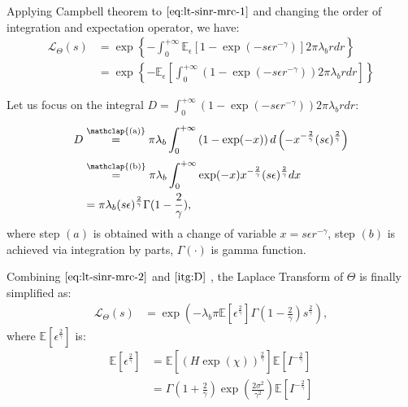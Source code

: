 Applying Campbell theorem to $\eqref{eq:lt-sinr-mrc-1}$ and changing the order of integration and expectation operator, we have:
\begin{align}
\label{eq:lt-sinr-mrc-2}
\mathcal{L}_{\Theta}\left( s \right) &= \exp \left\lbrace -\int_{0}^{+\infty}    \mathbb{E}_{\epsilon}\left[ 1-\exp(-s\epsilon r^{-\gamma} ) \right]   2 \pi \lambda_{b} r dr \right\rbrace \nonumber\\
&= \exp \left\lbrace -\mathbb{E}_{\epsilon}\left[ \int_{0}^{+\infty} \left(1-\exp(-s\epsilon r^{-\gamma} ) \right) 2 \pi \lambda_{b} r dr  \right]   \right\rbrace 
\end{align}

Let us focus on the integral $D = \int_{0}^{+\infty} \left(1-\exp(-s\epsilon r^{-\gamma} ) \right) 2 \pi \lambda_{b} r dr $:
\begin{align}
\label{itg:D}
D
&\overset{\mathclap{\strut\text{(a)}}} = \pi \lambda_{b} \int_{0}^{+\infty} \left(1-\exp(-x ) \right) d\left( -x^{-\frac{2}{\gamma}} (s\epsilon)^{\frac{2}{\gamma}}\right)  \nonumber\\
&\overset{\mathclap{\strut\text{(b)}}}= \pi \lambda_{b} \int_{0}^{+\infty} \exp(-x ) x^{-\frac{2}{\gamma}} (s\epsilon)^{\frac{2}{\gamma}} dx \nonumber\\
&= \pi \lambda_{b}  (s\epsilon)^{\frac{2}{\gamma}}  \Gamma (1 - \frac{2}{\gamma}),
\end{align}
where step $(a)$ is obtained with a change of variable $x = s \epsilon r^{-\gamma}$, step $(b)$ is achieved via integration by parts, $\Gamma(\cdot)$ is gamma function.

Combining $\eqref{eq:lt-sinr-mrc-2}$ and $\eqref{itg:D}$ , the Laplace Transform of $\Theta$ is finally simplified as:
\begin{align}
\label{eq:lt_Theta}
\mathcal{L}_{\Theta}\left( s \right) &= \exp(-\lambda_{b} \pi \mathbb{E}\left[ \epsilon ^{\frac{2}{\gamma}} \right]  \Gamma(1-\frac{2}{\gamma}) s^{\frac{2}{\gamma}}),
\end{align}
where $\mathbb{E}\left[ \epsilon ^{\frac{2}{\gamma}} \right] $ is:
\begin{align}
\label{eq:epsilon_fractional_moment}
\mathbb{E}\left[ \epsilon ^{\frac{2}{\gamma}} \right]  &= \mathbb{E}\left[ \left( H \exp(\chi)\right)  ^{\frac{2}{\gamma}} \right] \mathbb{E}\left[ I ^{-\frac{2}{\gamma}}\right] \nonumber\\
&=\Gamma(1+\frac{2}{\gamma}) \exp( \frac{2\sigma^2}{\gamma^2}) \mathbb{E}\left[ I ^{-\frac{2}{\gamma}}\right] 
\end{align}


